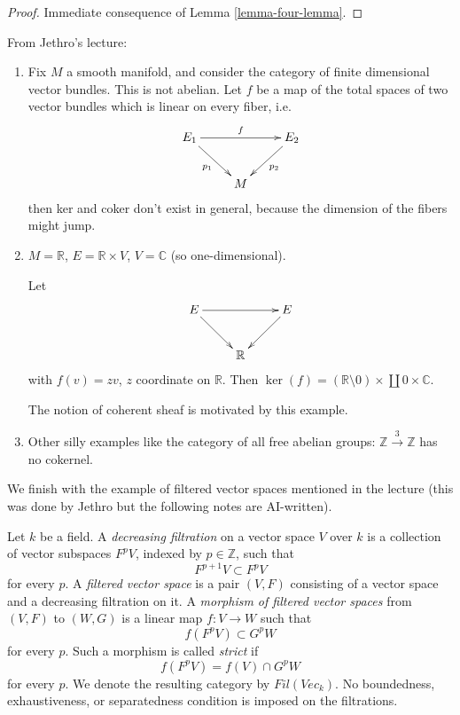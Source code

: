 \begin{proof}
Immediate consequence of
Lemma \ref{lemma-four-lemma}.
\end{proof}

\medskip\noindent
From Jethro's lecture:

\begin{example}
\label{example-non-abelian-categories}
\begin{enumerate}
\item Fix $M$ a smooth manifold,
and consider the category of finite
dimensional vector bundles.
This is not abelian.
Let $f$ be a map of the total spaces
of two vector bundles which is linear
on every fiber, i.e.
$$
\xymatrix{
E_1\ar[rr]^{f}\ar[dr]_{p_1}
&&E_2\ar[dl]^{p_2}\\
&M
}
$$
then ker and coker don't exist in general,
because the dimension of the fibers
might jump.

\item $M=\mathbb{R}$, $E=\mathbb{R}\times
V$,
$V=\mathbb{C}$ (so one-dimensional).

Let
$$
\xymatrix{
E \ar[dr]\ar[rr]&& E \ar[dl]\\
& \mathbb{R}
}
$$
with $f(v)=zv$, $z $ coordinate on
$\mathbb{R}$.
Then $\ker(f)=(\mathbb{R}\setminus 0)
\times \coprod 0 \times \mathbb{C}$.

The notion of coherent sheaf
is motivated by this example.

\item Other silly examples like the category
of all free abelian groups:
$\mathbb{Z} \xrightarrow{3}\mathbb{Z}$
has no cokernel.
\end{enumerate}
\end{example}

\medskip\noindent
We finish with the example of filtered
vector spaces mentioned in the lecture
(this was done by Jethro but the following
notes are AI-written).

\begin{definition}
\label{definition-filtered}
Let $k$ be a field. A {\it decreasing
filtration} on a vector space $V$ over $k$
is a collection of vector subspaces $F^pV$,
indexed by $p \in \mathbb{Z}$, such that
$$
F^{p + 1}V \subset F^pV
$$
for every $p$. A {\it filtered vector space}
is a pair $(V, F)$ consisting of a vector
space and a decreasing filtration on it.
A {\it morphism of filtered vector spaces}
from $(V, F)$ to $(W, G)$ is a linear map
$f : V \to W$ such that
$$
f(F^pV) \subset G^pW
$$
for every $p$. Such a morphism is called
{\it strict} if
$$
f(F^pV)=f(V)\cap G^pW
$$
for every $p$. We denote the resulting
category by $\mathit{Fil}(\mathit{Vec}_k)$.
No boundedness, exhaustiveness, or
separatedness condition is imposed on the
filtrations.
\end{definition}

